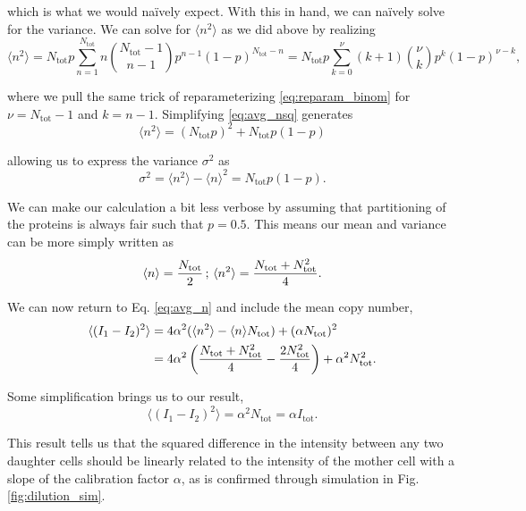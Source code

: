 which is what we would naïvely expect. With this in hand, we can naïvely solve
for the variance. We can solve for $\langle n^2 \rangle$ as we did above by
realizing
\begin{equation}
\langle n^2 \rangle = N_\text{tot}p\sum\limits_{n=1}^{N_\text{tot}}n{{N_\text{tot} - 1}\choose{n -1}}p^{n-1}(1 - p)^{N_\text{tot} - n} = N_\text{tot}p\sum\limits_{k=0}^\nu(k + 1){{\nu}\choose{k}}p^k(1-p)^{\nu - k}  \tag{14},
\label{eq:avg_nsq}
\end{equation}

where we pull the same trick of reparameterizing \ref{eq:reparam_binom} for $\nu = N_\text{tot} - 1$ and $k = n - 1$. Simplifying \ref{eq:avg_nsq} generates
\begin{equation}
\langle n^2 \rangle = (N_\text{tot}p)^2 + N_\text{tot}p(1 - p) \tag{15}
\end{equation}

allowing us to express the variance $\sigma^2$ as
\begin{equation}
\sigma^2 = \langle n^2 \rangle - \langle n \rangle^2 = N_\text{tot}p(1 - p).
\end{equation}

We can make our calculation a bit less verbose by assuming that partitioning
of the proteins is always fair such that $p = 0.5$. This means our mean and
variance can be more simply written as
\begin{equation}
\langle n \rangle = {N_\text{tot} \over 2}\, ; \, \langle n^2 \rangle= {N_\text{tot}+ N_\text{tot}^2 \over 4}.
\label{eq:mean_var}
\end{equation}

We can now return to Eq. \ref{eq:avg_n} and include the mean copy number,
\begin{align}
\langle (I_1 - I_2)^2 \rangle &= 4\alpha^2(\langle n^2 \rangle - \langle n \rangle N_\text{tot}) + (\alpha N_\text{tot})^2\\
& = 4\alpha^2\left({N_\text{tot} + N_\text{tot}^2 \over 4} - {2N_\text{tot}^2 \over 4}\right) + \alpha^2N_\text{tot}^2.
\end{align}

Some simplification brings us to our result,
\begin{equation}
\langle (I_1 - I_2)^2 \rangle = \alpha^2 N_\text{tot} = \alpha I_\text{tot}.
\label{eq:golden_rule}
\end{equation}

This result tells us that the squared difference in the intensity between any
two daughter cells should be linearly related to the intensity of the mother
cell with a slope of the calibration factor $\alpha$, as is confirmed through
simulation in Fig. \ref{fig:dilution_sim}.


